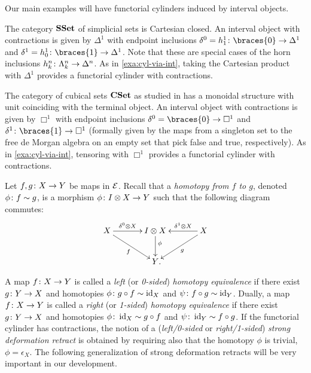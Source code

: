 \documentclass[reqno,10pt,a4paper,oneside,draft]{amsart}
\begin{document}
Our main examples will have functorial cylinders induced by interval objects.

\begin{example} \label{exa:cyl-in-sset}
The category $\mathbf{SSet}$ of simplicial sets is Cartesian closed.
An interval object with contractions is given by $\Delta^1$ with endpoint inclusions $\lcyl = h_1^1 \co \braces{0} \to \Delta^1$ and $\rcyl = h_0^1 \co \braces{1} \to \Delta^1$.
Note that these are special cases of the horn inclusions $h_k^n \colon \Lambda_k^n \to \Delta^n$.
As in \cref{exa:cyl-via-int}, taking the Cartesian product with $\Delta^1$ provides a functorial cylinder with contractions.
\end{example}

\begin{example} \label{exa:cyl-in-cuset}
The category of cubical sets $\mathbf{CSet}$ as studied in \cite{cohen-et-al:cubicaltt} has a monoidal structure with unit coinciding with the terminal object.
An interval object with contractions is given by $\Box^1$ with endpoint inclusions $\lcyl = \braces{0} \to \Box^1$ and $\rcyl \co \braces{1} \to \Box^1$ (formally given by the maps from a singleton set to the free de Morgan algebra on an empty set that pick false and true, respectively).
As in \cref{exa:cyl-via-int}, tensoring with $\Box^1$ provides a functorial cylinder with contractions.
\end{example}

Let $f, g \colon X \to Y$ be maps in $\mathcal{E}$.
Recall that a \emph{homotopy from $f$ to $g$}, denoted $\phi \colon f \sim g$, is a morphism $\phi \colon I \otimes X \to Y$ such that the following diagram commutes:
\begin{equation}
\label{equ:homotopy}
\begin{gathered}
\xymatrix@C=1.2cm{
  X
  \ar[r]^-{\lcyl \otimes X}
  \ar[dr]_{f}
&
  \interval \otimes X
  \ar[d]^(0.4){\phi}
&
  X
  \ar[dl]^{g}
  \ar[l]_-{\rcyl \otimes X}
\\&
  Y
\rlap{.}}
\end{gathered}
\end{equation}

A map $f \colon X \to Y$ is called a \emph{left} (or \emph{0-sided}) \emph{homotopy equivalence} if there exist $g \colon Y \to X$ and homotopies $\phi \colon g \mathbin{\circ} f \sim \operatorname{id}_X $ and $\psi \colon f \mathbin{\circ} g \sim \operatorname{id}_Y$.
Dually, a map $f \colon X \to Y$ is called a \emph{right} (or \emph{1-sided}) \emph{homotopy equivalence} if there exist $g \colon Y \to X$ and homotopies $\phi \colon \operatorname{id}_X \sim g \mathbin{\circ} f$ and $\psi \colon \operatorname{id}_Y \sim f \mathbin{\circ} g$.
If the functorial cylinder has contractions, the notion of a (\emph{left/0-sided} or \emph{right/1-sided}) \emph{strong deformation retract} is obtained by requiring also that the homotopy $\phi$ is trivial, \ie $\phi = \epsilon_X$.
The following generalization of strong deformation retracts will be very important in our development.
\end{document}
